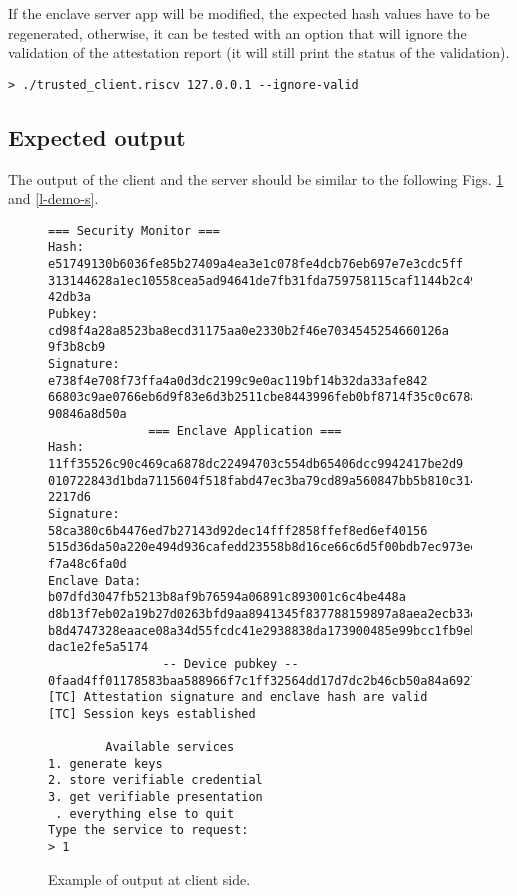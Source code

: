 If the enclave server app will be modified, the expected hash values have to be regenerated, otherwise, it can be tested with an option that will ignore the validation of the attestation report (it will still print the status of the validation). \\

\begin{lstlisting}[style=terminal,frame=single]
> ./trusted_client.riscv 127.0.0.1 --ignore-valid        
\end{lstlisting}

\subsection{Expected output}
The output of the client and the server should be similar to the following Figs. \ref{l-demo-c} and \ref{l-demo-s}.
\begin{figure}[H]
\begin{lstlisting}[frame=single]
              === Security Monitor ===
Hash: e51749130b6036fe85b27409a4ea3e1c078fe4dcb76eb697e7e3cdc5ff
313144628a1ec10558cea5ad94641de7fb31fda759758115caf1144b2c49603f
42db3a
Pubkey: cd98f4a28a8523ba8ecd31175aa0e2330b2f46e7034545254660126a
9f3b8cb9
Signature: e738f4e708f73ffa4a0d3dc2199c9e0ac119bf14b32da33afe842
66803c9ae0766eb6d9f83e6d3b2511cbe8443996feb0bf8714f35c0c678aa593
90846a8d50a
              === Enclave Application ===
Hash: 11ff35526c90c469ca6878dc22494703c554db65406dcc9942417be2d9
010722843d1bda7115604f518fabd47ec3ba79cd89a560847bb5b810c314201e
2217d6
Signature: 58ca380c6b4476ed7b27143d92dec14fff2858ffef8ed6ef40156
515d36da50a220e494d936cafedd23558b8d16ce66c6d5f00bdb7ec973ee46ec
f7a48c6fa0d
Enclave Data: b07dfd3047fb5213b8af9b76594a06891c893001c6c4be448a
d8b13f7eb02a19b27d0263bfd9aa8941345f837788159897a8aea2ecb33da926
b8d4747328eaace08a34d55fcdc41e2938838da173900485e99bcc1fb9eb7b00
dac1e2fe5a5174
                -- Device pubkey --
0faad4ff01178583baa588966f7c1ff32564dd17d7dc2b46cb50a84a69270b4c
[TC] Attestation signature and enclave hash are valid
[TC] Session keys established

        Available services
1. generate keys
2. store verifiable credential
3. get verifiable presentation
 . everything else to quit 
Type the service to request:
> 1
\end{lstlisting}
\caption{Example of output at client side. \label{l-demo-c}}
\end{figure}
\newpage


